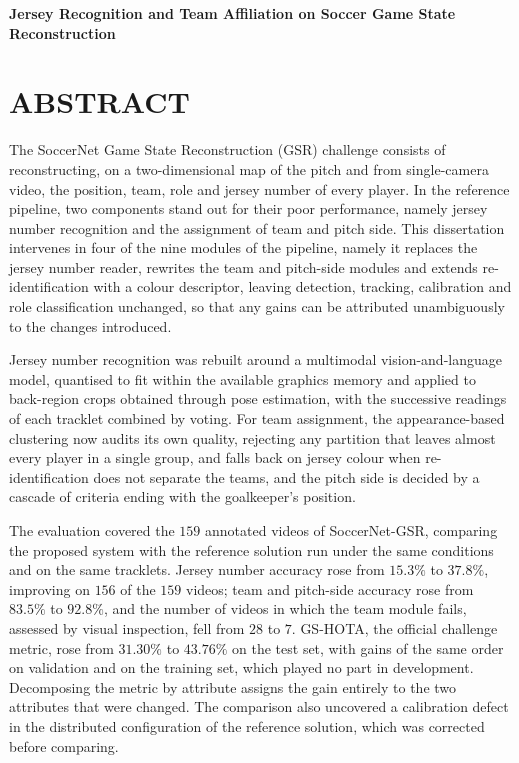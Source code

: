 \begingroup
\begin{flushleft}
\bfseries
{}
{\Large
Jersey Recognition and Team Affiliation on Soccer Game State Reconstruction}

\mdseries
\end{flushleft}
\normalsize
\let\clearpage\relax
\chapter{ABSTRACT}
\endgroup

\noindent The SoccerNet Game State Reconstruction (GSR) challenge consists of reconstructing, on a
two-dimensional map of the pitch and from single-camera video, the position, team, role and jersey
number of every player. In the reference pipeline, two components stand out for their poor
performance, namely jersey number recognition and the assignment of team and pitch side. This
dissertation intervenes in four of the nine modules of the pipeline, namely it replaces the jersey number
reader, rewrites the team and pitch-side modules and extends re-identification with a colour
descriptor, leaving detection, tracking, calibration and role classification unchanged, so that
any gains can be attributed unambiguously to the changes introduced.

Jersey number recognition was rebuilt around a multimodal vision-and-language model, quantised to
fit within the available graphics memory and applied to back-region crops obtained through pose
estimation, with the successive readings of each tracklet combined by voting. For team assignment,
the appearance-based clustering now audits its own quality, rejecting any partition that leaves
almost every player in a single group, and falls back on jersey colour when
re-identification does not separate the teams, and the pitch side is decided by a cascade of
criteria ending with the goalkeeper's position.

The evaluation covered the $159$ annotated videos of SoccerNet-GSR, comparing the proposed system
with the reference solution run under the same conditions and on the same tracklets. Jersey number
accuracy rose from $15.3\%$ to $37.8\%$, improving on $156$ of the $159$ videos;
team and pitch-side accuracy rose from $83.5\%$ to $92.8\%$, and the number of videos in
which the team module fails, assessed by visual inspection, fell from $28$ to
$7$. GS-HOTA, the official challenge metric, rose from $31.30\%$ to $43.76\%$
on the test set, with gains of the same order on validation and on the training set, which played
no part in development. Decomposing the metric by attribute assigns the gain entirely to the two
attributes that were changed. The comparison also uncovered a calibration defect in the distributed
configuration of the reference solution, which was corrected before comparing.

